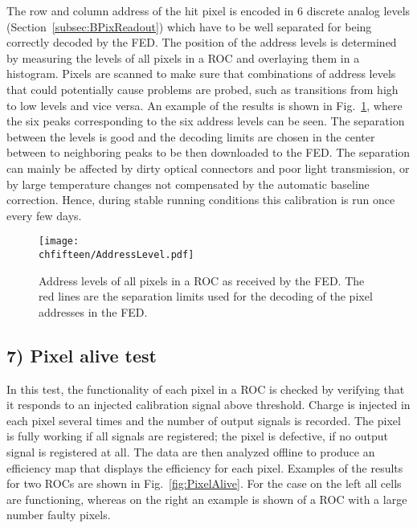 The row and column address of the hit pixel is encoded in 6 discrete analog levels (Section~\ref{subsec:BPixReadout}) which have to be well separated for being correctly decoded by the FED.
The position of the address levels is determined by measuring the levels of all pixels in a ROC and overlaying them in a histogram.
Pixels are scanned to make sure that combinations of address levels that could potentially cause problems are probed, such as transitions from high to low levels and vice versa.
An example of the results is shown in Fig.~\ref{fig:AddressLevel}, where the six peaks corresponding to the six address levels can be seen.
The separation between the levels is good and the decoding limits are chosen in the center between to neighboring peaks to be then downloaded to the FED.
The separation can mainly be affected by dirty optical connectors and poor light transmission, or by large temperature changes not compensated by the automatic baseline correction. Hence, during stable running conditions this calibration is run once every few days.

\begin{figure}[!htb]
 \begin{center}
 \texttt{[image: \\chfifteen/AddressLevel.pdf]}
 \end{center}
 \caption{Address levels of all pixels in a ROC as received by the FED. The red lines are the separation limits used for the decoding of the pixel addresses in the FED.}
 \label{fig:AddressLevel}
\end{figure}

\subsection*{7) Pixel alive test}

In this test, the functionality of each pixel in a ROC is checked by verifying that it responds to an injected calibration signal above threshold.
Charge is injected in each pixel several times and the number of output signals is recorded.
The pixel is fully working if all signals are registered; the pixel is defective, if no output signal is registered at all.
The data are then analyzed offline to produce an efficiency map that displays the efficiency for each pixel. Examples of the results for two ROCs are shown in Fig.~\ref{fig:PixelAlive}.
For the case on the left all cells are functioning, whereas on the right an example is shown of a ROC with a large number faulty pixels.

